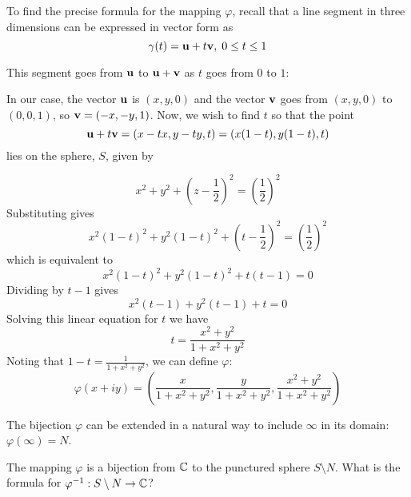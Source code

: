 \documentclass[handout]{ximera}
\begin{document}
To find the precise formula for the mapping $\varphi$, recall that a line segment in three dimensions can be expressed in vector form as
\[
\gamma(t) = {\bf u} + t{\bf v},  \; 0 \leq t \leq 1
\]

This segment goes from ${\bf u}$ to ${\bf u} + {\bf v}$ as $t$ goes from $0$ to $1$:

\begin{image}
\end{image}

In our case, the vector ${\bf u}$ is $(x,y,0)$ and the vector ${\bf v}$ goes from $(x, y, 0)$ to $(0, 0, 1)$, so ${\bf v} = (-x, -y, 1)$. 
Now, we wish to find $t$ so that the point
\[
{\bf u}+ t{\bf v} = (x- tx,y- ty, t) = (x(1-t), y(1-t), t)
\]
lies on the sphere, $S$, given by

\[
x^2 + y^2 + \left(z-\frac12 \right)^2 = \left(\frac12\right)^2
\]
Substituting gives
\[
x^2(1-t)^2 + y^2(1-t)^2 + \left(t-\frac12 \right)^2 = \left(\frac12\right)^2
\]
which is equivalent to 
\[
x^2(1-t)^2 + y^2(1-t)^2 + t(t-1) = 0
\]
Dividing by $t-1$ gives
\[
x^2(t-1) + y^2(t-1) + t = 0
\]
Solving this linear equation for $t$ we have
\[
t= \frac{x^2 + y^2}{1+x^2+y^2}
\]
Noting that $\displaystyle 1-t = \frac{1}{1+x^2 +y^2}$, we can define $\varphi$:
\[
\varphi(x+iy)   = \left( \frac{x}{1+x^2 +y^2}, \frac{y}{1+x^2 +y^2}, \frac{x^2 + y^2}{1+x^2+y^2} \right)
\]

The bijection $\varphi$ can be extended in a natural way to include $\infty$ in its domain: $\varphi(\infty) = N$.

\begin{question} The mapping $\varphi$ is a bijection from $\mathbb C$ to the punctured sphere $S \setminus N$.
What is the formula for $\varphi^{-1} : S \setminus N \to \mathbb C$?
\end{question}
\end{document}
